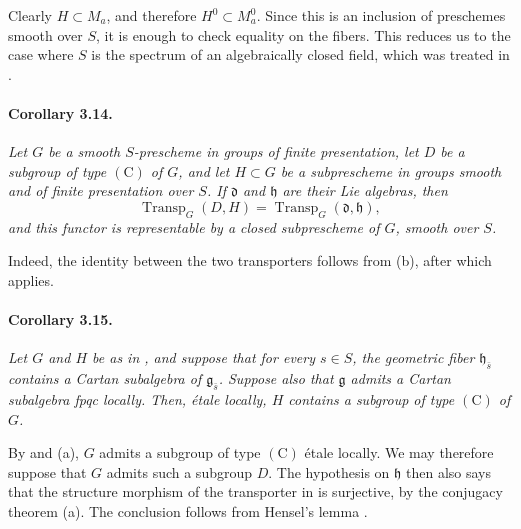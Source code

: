 Clearly \(H\subset M_a\), and therefore
\(H^0\subset M_a^0\). Since this is an inclusion of preschemes
smooth over \(S\), it is enough to check equality on the fibers.
This reduces us to the case where \(S\) is the spectrum of an
algebraically closed field, which was treated in .

\paragraph{\textbf{Corollary 3.14.}}
{\itshape Let \(G\) be a smooth \(S\)-prescheme in groups of finite
presentation, let \(D\) be a subgroup of type \((\mathrm C)\) of
\(G\), and let \(H\subset G\) be a subprescheme in groups smooth
and of finite presentation over \(S\). If \(\mathfrak d\) and
\(\mathfrak h\) are their Lie algebras, then
\[
  \operatorname{Transp}_G(D,H)
  =
  \operatorname{Transp}_G(\mathfrak d,\mathfrak h),
\]
and this functor is representable by a closed subprescheme of
\(G\), smooth over \(S\).}

Indeed, the identity between the two transporters follows from
\textup{(b)}, after which  applies.

\paragraph{\textbf{Corollary 3.15.}}
{\itshape Let \(G\) and \(H\) be as in , and suppose that for
every \(s\in S\), the geometric fiber \(\mathfrak h_{\bar s}\)
contains a Cartan subalgebra of \(\mathfrak g_{\bar s}\). Suppose
also that \(\mathfrak g\) admits a Cartan subalgebra fpqc locally.
Then, étale locally, \(H\) contains a subgroup of type
\((\mathrm C)\) of \(G\).}

By  and \textup{(a)}, \(G\) admits a subgroup of type
\((\mathrm C)\) étale locally. We may therefore suppose that \(G\)
admits such a subgroup \(D\). The hypothesis on \(\mathfrak h\)
then also says that the structure morphism of the transporter in
 is surjective, by the conjugacy theorem \textup{(a)}.
The conclusion follows from Hensel's lemma .

